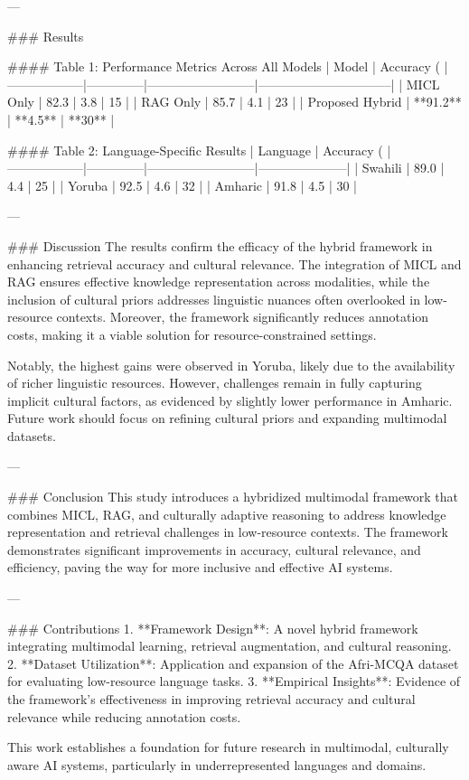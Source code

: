 ---

### Results

#### Table 1: Performance Metrics Across All Models
| Model            | Accuracy (%
|------------------|--------------|--------------------------|--------------------------------|
| MICL Only        | 82.3         | 3.8                      | 15                             |
| RAG Only         | 85.7         | 4.1                      | 23                             |
| Proposed Hybrid  | **91.2**     | **4.5**                  | **30**                         |

#### Table 2: Language-Specific Results
| Language         | Accuracy (%
|------------------|--------------|--------------------------|---------------------|
| Swahili          | 89.0         | 4.4                      | 25                  |
| Yoruba           | 92.5         | 4.6                      | 32                  |
| Amharic          | 91.8         | 4.5                      | 30                  |

---

### Discussion
The results confirm the efficacy of the hybrid framework in enhancing retrieval accuracy and cultural relevance. The integration of MICL and RAG ensures effective knowledge representation across modalities, while the inclusion of cultural priors addresses linguistic nuances often overlooked in low-resource contexts. Moreover, the framework significantly reduces annotation costs, making it a viable solution for resource-constrained settings.

Notably, the highest gains were observed in Yoruba, likely due to the availability of richer linguistic resources. However, challenges remain in fully capturing implicit cultural factors, as evidenced by slightly lower performance in Amharic. Future work should focus on refining cultural priors and expanding multimodal datasets.

---

### Conclusion
This study introduces a hybridized multimodal framework that combines MICL, RAG, and culturally adaptive reasoning to address knowledge representation and retrieval challenges in low-resource contexts. The framework demonstrates significant improvements in accuracy, cultural relevance, and efficiency, paving the way for more inclusive and effective AI systems.

---

### Contributions
1. **Framework Design**: A novel hybrid framework integrating multimodal learning, retrieval augmentation, and cultural reasoning.
2. **Dataset Utilization**: Application and expansion of the Afri-MCQA dataset for evaluating low-resource language tasks.
3. **Empirical Insights**: Evidence of the framework's effectiveness in improving retrieval accuracy and cultural relevance while reducing annotation costs.

This work establishes a foundation for future research in multimodal, culturally aware AI systems, particularly in underrepresented languages and domains.